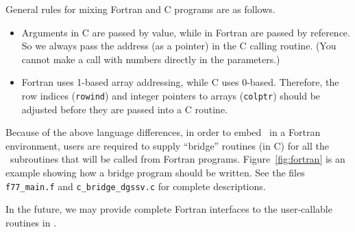 General rules for mixing Fortran and C programs are as follows.

\begin{itemize}
\item Arguments in C are passed by value, while in Fortran are passed by
      reference.  So we always pass the address (as a pointer) in the C 
      calling routine. (You cannot make a call with numbers directly in 
      the parameters.)
\item Fortran uses 1-based array addressing, while C uses 0-based.
      Therefore, the row indices ({\tt rowind}) and integer pointers
      to arrays ({\tt colptr}) should be adjusted before they 
      are passed into a C routine.
\end{itemize}

Because of the above language differences, in order to embed \SuperLU\ 
in a Fortran environment, users are required
to supply ``bridge'' routines (in C) for all the \SuperLU\ subroutines
that will be called from Fortran programs. Figure~\ref{fig:fortran}
is an example showing how a bridge program should be written.
See the files {\tt f77\_main.f} and {\tt c\_bridge\_dgssv.c} for 
complete descriptions.

In the future, we may provide complete Fortran interfaces
to the user-callable routines in {\SuperLU}.
